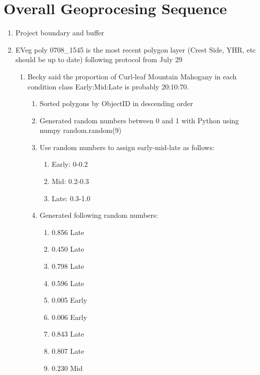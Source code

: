 \section{Overall Geoprocesing Sequence}
\begin{enumerate}
\item Project boundary and buffer
\item EVeg poly 0708\_1545 is the most recent polygon layer (Crest Side, YHR, etc should be up to date) following protocol from July 29
    \begin{enumerate}
        \item Becky said the proportion of Curl-leaf Mountain Mahogany in each condition class Early:Mid:Late is probably 20:10:70.
            \begin{enumerate}
            \item Sorted polygons by ObjectID in descending order
            \item Generated random numbers between 0 and 1 with Python using numpy random.random(9)
            \item Use random numbers to assign early-mid-late as follows:
                \begin{enumerate}
                    \item Early: 0-0.2
                    \item Mid: 0.2-0.3
                    \item Late: 0.3-1.0
                \end{enumerate} 
            \item Generated following random numbers:
                \begin{enumerate}
                    \item 0.856 \textrightarrow Late
                    \item 0.450 \textrightarrow Late
                    \item 0.798 \textrightarrow Late
                    \item 0.596 \textrightarrow Late
                    \item 0.005 \textrightarrow Early
                    \item 0.006 \textrightarrow Early
                    \item 0.843 \textrightarrow Late
                    \item 0.807 \textrightarrow Late
                    \item 0.230 \textrightarrow Mid
                \end{enumerate}
            \end{enumerate}


\end{enumerate}
\end{enumerate}

